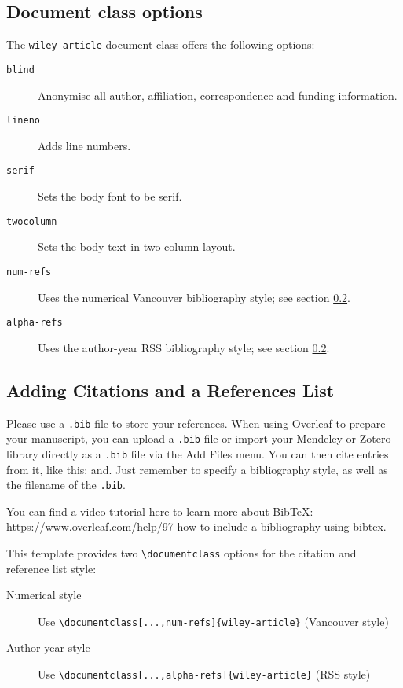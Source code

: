 \subsection{Document class options}

The \texttt{wiley-article} document class offers the following options:

\begin{description}
       \item[\texttt{blind}] Anonymise all author, affiliation, correspondence
             and funding information.

       \item[\texttt{lineno}] Adds line numbers.

       \item[\texttt{serif}] Sets the body font to be serif.

       \item[\texttt{twocolumn}] Sets the body text in two-column layout.

       \item[\texttt{num-refs}] Uses the numerical Vancouver bibliography style; see section \ref{sec:bibstyles}.

       \item[\texttt{alpha-refs}] Uses the author-year RSS bibliography style; see section \ref{sec:bibstyles}.
\end{description}

\subsection{Adding Citations and a References List}
\label{sec:bibstyles}

Please use a \verb|.bib| file to store your references. When using Overleaf to prepare your manuscript, you can upload a \verb|.bib| file or import your Mendeley or Zotero library directly as a \verb|.bib| file via the Add Files menu. You can then cite entries from it, like this: and. Just remember to specify a bibliography style, as well as the filename of the \verb|.bib|.

You can find a video tutorial here to learn more about BibTeX: \url{https://www.overleaf.com/help/97-how-to-include-a-bibliography-using-bibtex}.

This template provides two \verb|\documentclass| options for the citation and reference list style:
\begin{description}
       \item[Numerical style] Use \verb|\documentclass[...,num-refs]{wiley-article}| (Vancouver style)
       \item[Author-year style] Use \verb|\documentclass[...,alpha-refs]{wiley-article}| (RSS style)
\end{description}

